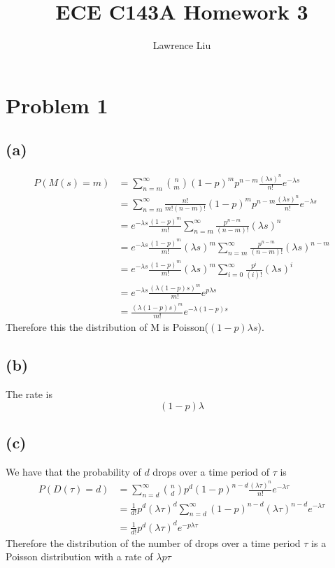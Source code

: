 \documentclass[12pt]{article}
\title{ECE C143A Homework 3}
\author{Lawrence Liu}
\begin{document}
\maketitle
\section*{Problem 1}
\subsection*{(a)}
\begin{align*}
    P(M(s)=m)&=\sum_{n=m}^{\infty}\binom{n}{m}(1-p)^mp^{n-m}\frac{(\lambda s)^n}{n!}e^{-\lambda s}\\
            &=\sum_{n=m}^{\infty}\frac{n!}{m!(n-m)!}(1-p)^mp^{n-m}\frac{(\lambda s)^n}{n!}e^{-\lambda s}\\
            &=e^{-\lambda s}\frac{(1-p)^m}{m!}\sum_{n=m}^{\infty}\frac{p^{n-m}}{(n-m)!}(\lambda s)^n\\
            &=e^{-\lambda s}\frac{(1-p)^m}{m!}(\lambda s)^{m}\sum_{n=m}^{\infty}\frac{p^{n-m}}{(n-m)!}(\lambda s)^{n-m}\\
            &=e^{-\lambda s}\frac{(1-p)^m}{m!}(\lambda s)^{m}\sum_{i=0}^{\infty}\frac{p^{i}}{(i)!}(\lambda s)^{i}\\
            &=e^{-\lambda s}\frac{(\lambda(1-p)s)^m}{m!}e^{p\lambda s}\\
            &=\frac{(\lambda(1-p)s)^m}{m!}e^{-\lambda(1-p)s}
\end{align*}
Therefore this the distribution of M is Poisson($(1-p)\lambda s$).
\subsection*{(b)}
The rate is 
$$(1-p)\lambda$$
\subsection*{(c)}
We have that the probability of $d$ drops over a time period of $\tau$ is 
\begin{align*}
    P(D(\tau)=d)&=\sum_{n=d}^{\infty}\binom{n}{d}p^d(1-p)^{n-d}\frac{(\lambda\tau)^n}{n!}e^{-\lambda \tau}\\
    &=\frac{1}{d!}p^d(\lambda\tau)^d\sum_{n=d}^{\infty}(1-p)^{n-d}(\lambda\tau)^{n-d}e^{-\lambda\tau}\\
    &=\frac{1}{d!}p^d(\lambda\tau)^de^{-p\lambda\tau}
\end{align*}
Therefore the distribution of the number of drops over a time period $\tau$ is a Poisson distribution with a rate of $\lambda p \tau$
\end{document}
